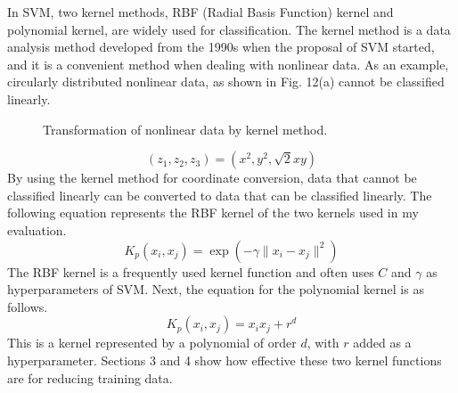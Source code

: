 In SVM, two kernel methods, RBF (Radial Basis Function) kernel and polynomial kernel, are widely used for classification. The kernel method is a data analysis method developed from the 1990s when the proposal of SVM started, and it is a convenient method when dealing with nonlinear data. As an example, circularly distributed nonlinear data, as shown in Fig. 12(a) cannot be classified linearly.
\begin{figure}[t]
  \begin{center}
\end{center}
\caption{Transformation of nonlinear data by kernel method.}
\vspace*{-3pt}
\end{figure}
\begin{equation}
(z_1,z_2,z_3) = (x^2,y^2,\sqrt{2}xy)
\end{equation}
By using the kernel method for coordinate conversion, data that cannot be classified linearly can be converted to data that can be classified linearly. The following equation represents the RBF kernel of the two kernels used in my evaluation. 
\begin{equation}
K_p(x_i,x_j) = \exp(-\gamma\|x_i-x_j\|^2)
\end{equation}
The RBF kernel is a frequently used kernel function and often uses $C$ and $\gamma$ as hyperparameters of SVM. Next, the equation for the polynomial kernel is as follows.
\begin{equation}
K_p(x_i,x_j) = {x_ix_j+r}^{d}
\end{equation}
This is a kernel represented by a polynomial of order $d$, with $r$ added as a hyperparameter. Sections 3 and 4 show how effective these two kernel functions are for reducing training data. 

